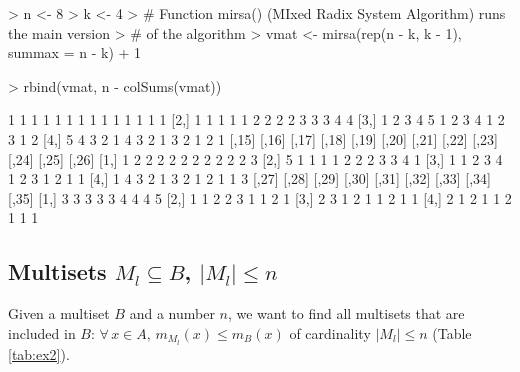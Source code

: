 \documentclass[11pt]{article}
\begin{document}
\begin{Schunk}
\begin{Sinput}
> n <- 8
> k <- 4
> # Function mirsa() (MIxed Radix System Algorithm) runs the main version 
> # of the algorithm 
> vmat <- mirsa(rep(n - k, k - 1), summax = n - k) + 1
\end{Sinput}
\end{Schunk}
\pagebreak %
\begin{Schunk}
\begin{Sinput}
> rbind(vmat, n - colSums(vmat))
\end{Sinput}
\begin{Soutput}
     [,1] [,2] [,3] [,4] [,5] [,6] [,7] [,8] [,9] [,10] [,11] [,12] [,13] [,14]
[1,]    1    1    1    1    1    1    1    1    1     1     1     1     1     1
[2,]    1    1    1    1    1    2    2    2    2     3     3     3     4     4
[3,]    1    2    3    4    5    1    2    3    4     1     2     3     1     2
[4,]    5    4    3    2    1    4    3    2    1     3     2     1     2     1
     [,15] [,16] [,17] [,18] [,19] [,20] [,21] [,22] [,23] [,24] [,25] [,26]
[1,]     1     2     2     2     2     2     2     2     2     2     2     3
[2,]     5     1     1     1     1     2     2     2     3     3     4     1
[3,]     1     1     2     3     4     1     2     3     1     2     1     1
[4,]     1     4     3     2     1     3     2     1     2     1     1     3
     [,27] [,28] [,29] [,30] [,31] [,32] [,33] [,34] [,35]
[1,]     3     3     3     3     3     4     4     4     5
[2,]     1     1     2     2     3     1     1     2     1
[3,]     2     3     1     2     1     1     2     1     1
[4,]     2     1     2     1     1     2     1     1     1
\end{Soutput}
\end{Schunk}

\subsection{Multisets $M_l \subseteq B$, $|M_l| \leqslant n$}

Given a multiset $B$ and a number $n$, we want to find all multisets that are included in $B$: $\forall \, x \in A, \, m_{M_l}(x) \leqslant m_B(x)$ of cardinality $|M_l| \leqslant n$ (Table \ref{tab:ex2}). \\
\end{document}
